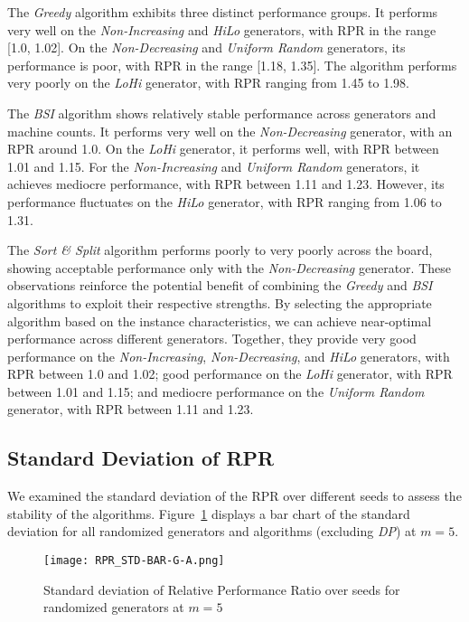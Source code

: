 The \textit{Greedy} algorithm exhibits three distinct performance groups. It performs very well on the \textit{Non-Increasing} and \textit{HiLo} generators, with RPR in the range [1.0, 1.02]. On the \textit{Non-Decreasing} and \textit{Uniform Random} generators, its performance is poor, with RPR in the range [1.18, 1.35]. The algorithm performs very poorly on the \textit{LoHi} generator, with RPR ranging from 1.45 to 1.98.

The \textit{BSI} algorithm shows relatively stable performance across generators and machine counts. It performs very well on the \textit{Non-Decreasing} generator, with an RPR around 1.0. On the \textit{LoHi} generator, it performs well, with RPR between 1.01 and 1.15. For the \textit{Non-Increasing} and \textit{Uniform Random} generators, it achieves mediocre performance, with RPR between 1.11 and 1.23. However, its performance fluctuates on the \textit{HiLo} generator, with RPR ranging from 1.06 to 1.31.

The \textit{Sort \& Split} algorithm performs poorly to very poorly across the board, showing acceptable performance only with the \textit{Non-Decreasing} generator. These observations reinforce the potential benefit of combining the \textit{Greedy} and \textit{BSI} algorithms to exploit their respective strengths. By selecting the appropriate algorithm based on the instance characteristics, we can achieve near-optimal performance across different generators. Together, they provide very good performance on the \textit{Non-Increasing}, \textit{Non-Decreasing}, and \textit{HiLo} generators, with RPR between 1.0 and 1.02; good performance on the \textit{LoHi} generator, with RPR between 1.01 and 1.15; and mediocre performance on the \textit{Uniform Random} generator, with RPR between 1.11 and 1.23.

\subsection{Standard Deviation of RPR}

We examined the standard deviation of the RPR over different seeds to assess the stability of the algorithms. Figure~\ref{fig:RPR-STD-BAR-G-A} displays a bar chart of the standard deviation for all randomized generators and algorithms (excluding \textit{DP}) at $m = 5$.

\begin{figure}
    \centering
    \texttt{[image: RPR\_STD-BAR-G-A.png]}
    \caption{Standard deviation of Relative Performance Ratio over seeds for randomized generators at $m = 5$}
    \label{fig:RPR-STD-BAR-G-A}
\end{figure}


